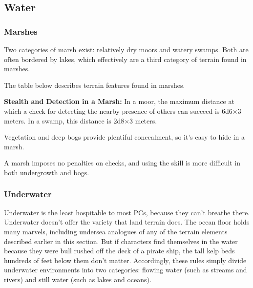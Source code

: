 \subsection{Water}

\subsubsection{Marshes}
Two categories of marsh exist: relatively dry moors and watery swamps. Both are often bordered by lakes, which effectively are a third category of terrain found in marshes.

The table below describes terrain features found in marshes.


\textbf{Stealth and Detection in a Marsh:} In a moor, the maximum distance at which a  check for detecting the nearby presence of others can succeed is 6d6$\times$3 meters. In a swamp, this distance is 2d8$\times$3 meters.

Vegetation and deep bogs provide plentiful concealment, so it's easy to hide in a marsh.

A marsh imposes no penalties on  checks, and using the  skill is more difficult in both undergrowth and bogs.

\subsubsection{Underwater}
Underwater is the least hospitable to most PCs, because they can't breathe there. Underwater doesn't offer the variety that land terrain does. The ocean floor holds many marvels, including undersea analogues of any of the terrain elements described earlier in this section. But if characters find themselves in the water because they were bull rushed off the deck of a pirate ship, the tall kelp beds hundreds of feet below them don't matter. Accordingly, these rules simply divide underwater environments into two categories: flowing water (such as streams and rivers) and still water (such as lakes and oceans).

